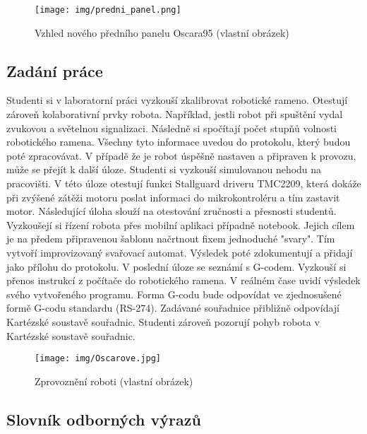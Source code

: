 \begin{figure}
		\begin{center}
			\texttt{[image: img/predni\_panel.png]}
			\caption{Vzhled nového předního panelu Oscara95 (vlastní obrázek)}
			\label{fig:predni_panel}
		\end{center}
		\vspace{-2mm}
	\end{figure}

\subsection{Zadání práce}
Studenti si v laboratorní práci vyzkouší zkalibrovat robotické rameno. Otestují zároveň kolaborativní prvky robota. Například, jestli robot při spuštění vydal zvukovou a světelnou signalizaci. Následně si spočítají počet stupňů volnosti robotického ramena. Všechny tyto informace uvedou do protokolu, který budou poté zpracovávat. V případě že je robot úspěšně nastaven a připraven k provozu, může se přejít k další úloze. Studenti si vyzkouší simulovanou nehodu na pracovišti. V této úloze otestují funkci Stallguard driveru TMC2209, která dokáže při zvýšené zátěži motoru poslat informaci do mikrokontroléru a tím zastavit motor. Následující úloha slouží na otestování zručnosti a přesnosti studentů. Vyzkoušejí si řízení robota přes mobilní aplikaci případně notebook. Jejich cílem je na předem připravenou šablonu načrtnout fixem jednoduché "svary". Tím vytvoří improvizovaný svařovací automat. Výsledek poté zdokumentují a přidají jako přílohu do protokolu. V poslední úloze se seznámí s G-codem. Vyzkouší si přenos instrukcí z počítače do robotického ramena. V reálném čase uvidí výsledek svého vytvořeného programu. Forma G-codu bude odpovídat ve zjednosušené formě G-codu standardu (RS-274). Zadávané souřadnice přibližně odpovídají Kartézské soustavě souřadnic. Studenti zároveň pozorují pohyb robota v Kartézské soustavě souřadnic.  \cite{G-code-wiki}

\begin{figure}
		\begin{center}
			\texttt{[image: img/Oscarove.jpg]}
			\caption{Zprovoznění roboti (vlastní obrázek)}
			\label{fig:Oscarove}
		\end{center}
		\vspace{-2mm}
	\end{figure}

\subsection{Slovník odborných výrazů}


